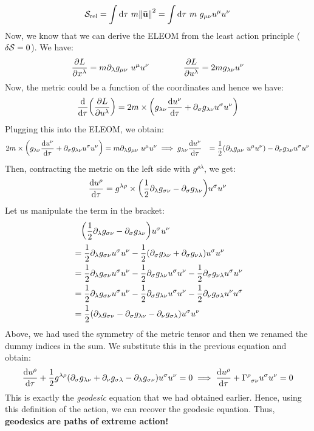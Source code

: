 $$\mathcal S_{\mathrm{rel}} = \int \dd \tau \ m \norm{\vb{\bar{u}}}^2 = \int \dd \tau \ m\ g_{\mu\nu}u^\mu u^\nu$$
Now, we know that we can derive the ELEOM from the least action principle ($\delta \mathcal S =0$). We have:
$$\pdv{L}{x^\lambda} =m \partial_\lambda g_{\mu\nu}\ u^\mu u^\nu \qquad \qquad \pdv{L}{u^\lambda} = 2mg_{\lambda\nu}u^\nu$$
Now, the metric could be a function of the coordinates and hence we have:
$$\dv{\tau}\qty(\pdv{L}{u^\lambda}) = 2m\times \qty(g_{\lambda\nu}\dv{u^\nu}{\tau}+\partial_\sigma g_{\lambda\nu}u^\sigma u^\nu)$$
Plugging this into the ELEOM, we obtain:
\begin{align*}
    2m\times \qty(g_{\lambda\nu}\dv{u^\nu}{\tau}+\partial_\sigma g_{\lambda\nu}u^\sigma u^\nu) &=m \partial_\lambda g_{\mu\nu}\ u^\mu u^\nu\implies g_{\lambda\nu}\dv{u^\nu}{\tau} &= \frac{1}{2}\qty(\partial_\lambda g_{\mu\nu}\ u^\mu u^\nu) -\partial_\sigma g_{\lambda\nu}u^\sigma u^\nu
\end{align*}
Then, contracting the metric on the left side with $g^{\rho\lambda}$, we get:
$$\dv{u^\rho}{\tau} = g^{\lambda \rho}\times \qty(\frac{1}{2}\partial_{\lambda}g_{\sigma\nu}-\partial_{\sigma}g_{\lambda\nu})u^{\sigma}u^\nu$$
Let us manipulate the term in the bracket:
\begin{align*}
    &\quad \qty(\frac{1}{2}\partial_{\lambda}g_{\sigma\nu}-\partial_{\sigma}g_{\lambda\nu})u^{\sigma}u^\nu\\
    &=\frac{1}{2}\partial_{\lambda}g_{\sigma\nu}u^{\sigma}u^\nu - \frac{1}{2}\qty(\partial_{\sigma}g_{\lambda\nu}+\partial_{\sigma}g_{\nu\lambda})u^{\sigma}u^\nu\\
    &=\frac{1}{2}\partial_{\lambda}g_{\sigma\nu}u^{\sigma}u^\nu - \frac{1}{2}\partial_{\sigma}g_{\lambda\nu}u^{\sigma}u^\nu-\frac{1}{2}\partial_{\sigma}g_{\nu\lambda}u^{\sigma}u^\nu \\
    &=\frac{1}{2}\partial_{\lambda}g_{\sigma\nu}u^{\sigma}u^\nu - \frac{1}{2}\partial_{\sigma}g_{\lambda\nu}u^{\sigma}u^\nu-\frac{1}{2}\partial_{\nu}g_{\sigma\lambda}u^{\nu}u^\sigma\\
    &=\frac{1}{2}\qty(\partial_{\lambda}g_{\sigma\nu} - \partial_{\sigma}g_{\lambda\nu}-\partial_{\nu}g_{\sigma\lambda})u^{\sigma}u^\nu
\end{align*}
Above, we had used the symmetry of the metric tensor and then we renamed the dummy indices in the sum. We substitute this in the previous equation and obtain:
\begin{align*}
    \dv{u^\rho}{\tau} +\frac{1}{2}g^{\lambda \rho}\qty( \partial_{\sigma}g_{\lambda\nu}+\partial_{\nu}g_{\sigma\lambda} -\partial_{\lambda}g_{\sigma\nu})u^{\sigma}u^\nu=0\implies \dv{u^\rho}{\tau} + \chris{\rho}{\sigma}{\nu}u^\sigma u^\nu = 0
\end{align*}
This is exactly the \textit{geodesic} equation that we had obtained earlier. Hence, using this definition of the action, we can recover the geodesic equation. Thus, \textbf{geodesics are paths of extreme action!}